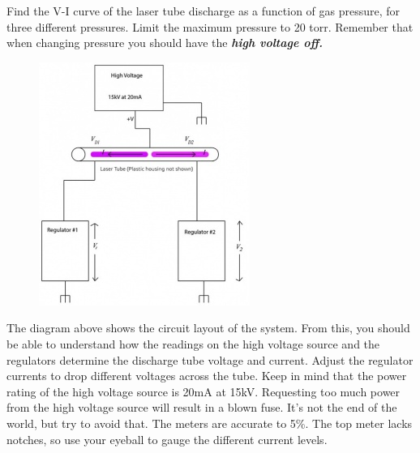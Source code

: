 \documentclass{../lab}
\begin{document}
Find the V-I curve of the laser tube discharge as a function of gas pressure, for three different pressures. Limit the maximum pressure to 20 torr. Remember that when changing pressure you should have the \emph{\textbf{high voltage off. }}


\begin{figure}[h]
    \centering
    \href{http://experimentationlab.berkeley.edu/sites/default/files/upimages/2_lasercircuitpic_small.jpg}{\includegraphics[width=\linewidth]{images/2_lasercircuitpic_small.jpg}}
    \caption{}
    \label{fig:2_lasercircuitpic_small}
\end{figure}

The diagram above shows the circuit layout of the system. From this, you should be able to understand how the readings on the high voltage source and the regulators determine the discharge tube voltage and current. Adjust the regulator currents to drop different voltages across the tube. Keep in mind that the power rating of the high voltage source is 20mA at 15kV. Requesting too much power from the high voltage source will result in a blown fuse. It's not the end of the world, but try to avoid that. The meters are accurate to 5\%. The top meter lacks notches, so use your eyeball to gauge the different current levels.
\end{document}
